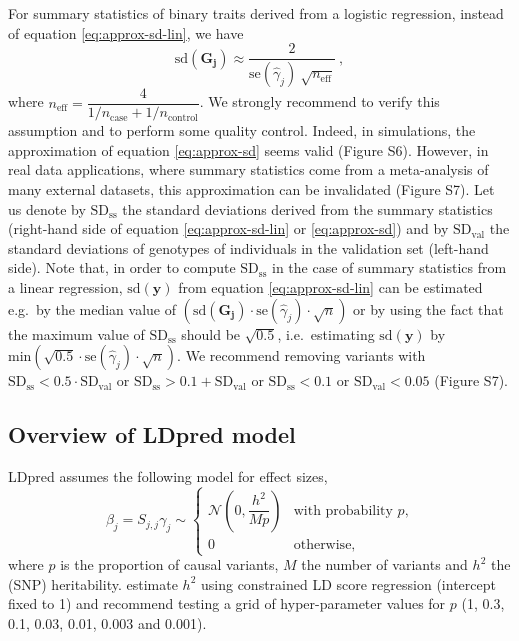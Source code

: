\documentclass{bioinfo}
\begin{document}
\begin{methods}
For summary statistics of binary traits derived from a logistic regression, instead of equation \eqref{eq:approx-sd-lin}, we have
\begin{equation}\label{eq:approx-sd}
\text{sd}(\boldsymbol{G_j}) \approx \dfrac{2}{\text{se}(\hat{\gamma}_j) ~ \sqrt{n_\text{eff}}} ~,
\end{equation}
where $n_\text{eff} = \dfrac{4	}{1 / n_\text{case} + 1 / n_\text{control}}$. We strongly recommend to verify this assumption and to perform some quality control.
Indeed, in simulations, the approximation of equation \eqref{eq:approx-sd} seems valid (Figure S6). 
However, in real data applications, where summary statistics come from a meta-analysis of many external datasets, this approximation can be invalidated (Figure S7).
Let us denote by $\text{SD}_\text{ss}$ the standard deviations derived from the summary statistics (right-hand side of equation \eqref{eq:approx-sd-lin} or \eqref{eq:approx-sd}) and by $\text{SD}_\text{val}$ the standard deviations of genotypes of individuals in the validation set (left-hand side).
Note that, in order to compute $\text{SD}_\text{ss}$ in the case of summary statistics from a linear regression, $\text{sd}(\boldsymbol{y})$ from equation \eqref{eq:approx-sd-lin} can be estimated e.g.\ by the median value of $\left(\text{sd}(\boldsymbol{G_j}) \cdot \text{se}(\hat{\gamma}_j) \cdot \sqrt{n}\right)$ or by using the fact that the maximum value of $\text{SD}_\text{ss}$ should be $\sqrt{0.5}$, i.e.\ estimating $\text{sd}(\boldsymbol{y})$ by $\text{min}\left(\sqrt{0.5}\cdot \text{se}(\hat{\gamma}_j) \cdot \sqrt{n}\right)$.
We recommend removing variants with $\text{SD}_\text{ss} < 0.5 \cdot \text{SD}_\text{val}$ or $\text{SD}_\text{ss} > 0.1 + \text{SD}_\text{val}$ or $\text{SD}_\text{ss} < 0.1$ or $\text{SD}_\text{val} < 0.05$ (Figure S7).


\subsection*{Overview of LDpred model}

LDpred assumes the following model for effect sizes,
\begin{equation}\label{eq:model}
\beta_j = S_{j,j} \gamma_j \sim \left\{
\begin{array}{ll}
\mathcal N\left(0, \dfrac{h^2}{M p}\right) & \mbox{with probability $p$,} \\
0 & \mbox{otherwise,}
\end{array}
\right.
\end{equation}
where $p$ is the proportion of causal variants, $M$ the number of variants and $h^2$ the (SNP) heritability.
\cite{vilhjalmsson2015modeling} estimate $h^2$ using constrained LD score regression (intercept fixed to 1) and recommend testing a grid of hyper-parameter values for $p$ (1, 0.3, 0.1, 0.03, 0.01, 0.003 and 0.001).


\end{methods}
\end{document}
